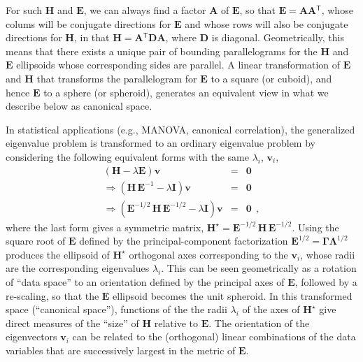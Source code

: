 \documentclass[11pt]{article}%
\renewcommand*{\vec}[1]{\ensuremath{\bm{#1}}}
\newcommand{\trans}{\ensuremath{^\mathsf{T}}}
\newcommand*{\mat}[1]{\ensuremath{\bm{#1}}}
\newcommand*{\inv}[1]{\ensuremath{\mat{#1}^{-1}}}
\newcommand*{\half}[1]{\ensuremath{\mat{#1}^{1/2}}}
\newcommand*{\invhalf}[1]{\ensuremath{\mat{#1}^{-1/2}}}
\newcommand*{\comma}{\:\: ,}
\begin{document}
For such \mat{H} and \mat{E}, we can always find a factor \mat{A} of \mat{E}, so that
$\mat{E} = \mat{A} \mat{A}\trans$, whose colums will be conjugate directions for \mat{E}
and whose rows will also be conjugate directions for \mat{H}, in that $\mat{H} = \mat{A}\trans \mat{D} \mat{A}$,
where $\mat{D}$ is diagonal.  Geometrically, this means that there exists a unique pair of
bounding parallelograms for the \mat{H} and \mat{E} ellipsoids whose
corresponding sides are parallel. A linear transformation of \mat{E} and \mat{H}
that transforms the parallelogram
for \mat{E} to a square (or cuboid), and hence \mat{E} to a sphere (or spheroid), generates an
equivalent view in what we describe below as canonical space.


In statistical applications (e.g., MANOVA, canonical correlation), the generalized
eigenvalue problem is transformed to an ordinary eigenvalue problem by considering
the following equivalent forms with the same $\lambda_i$, $\vec{v}_i$,
\begin{eqnarray*}
(\mat{H} - \lambda \mat{E}) \vec{v} & = & \vec{0} \\
\Rightarrow (\mat{H} \, \inv{\mat{E}} - \lambda \mat{I}) \vec{v} & = & \vec{0} \\
\Rightarrow (\invhalf{\mat{E}} \, \mat{H} \, \invhalf{\mat{E}} - \lambda \mat{I}) \vec{v} & = & \vec{0} \comma
\end{eqnarray*}
where the last form gives a symmetric matrix, $\mat{H}^\star = \invhalf{E} \, \mat{H} \, \invhalf{E}$.
Using the square root of \mat{E} defined by the
principal-component factorization $\half{E} = \mat{\Gamma} \half{\mat{\Lambda}}$ produces
the ellipsoid of $\mat{H}^\star$
orthogonal axes corresponding to the $\vec{v}_i$, whose radii are the corresponding
eigenvalues $\lambda_i$.  This can be seen geometrically as a rotation of ``data space''
to an orientation defined by the principal axes of \mat{E}, followed by a re-scaling, so
that the \mat{E} ellipsoid becomes the unit spheroid.  In this transformed space
(``canonical space''), functions of the
the radii $\lambda_i$ of the axes of $\mat{H}^\star$ give direct measures of
the ``size'' of \mat{H} relative to \mat{E}. The orientation of the eigenvectors
$\vec{v}_i$ can be related to the (orthogonal) linear combinations of the
data variables that are successively largest in the metric of \mat{E}.
\end{document}
